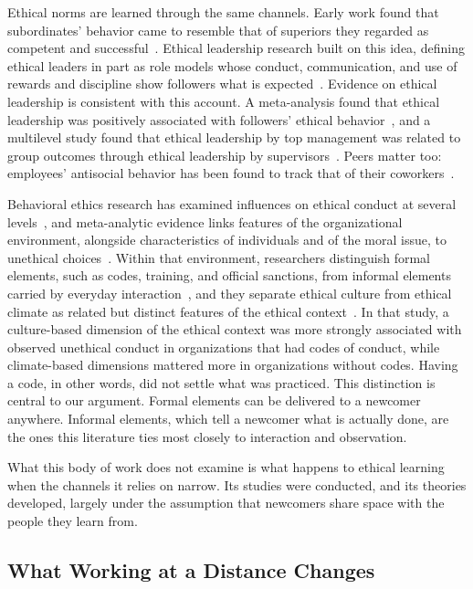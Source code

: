 Ethical norms are learned through the same channels. Early work found that subordinates' behavior came to resemble that of superiors they regarded as competent and successful~\citep{weiss1977subordinate}. Ethical leadership research built on this idea, defining ethical leaders in part as role models whose conduct, communication, and use of rewards and discipline show followers what is expected~\citep{brown2005ethical,brown2006ethical}. Evidence on ethical leadership is consistent with this account. A meta-analysis found that ethical leadership was positively associated with followers' ethical behavior~\citep{bedi2016meta}, and a multilevel study found that ethical leadership by top management was related to group outcomes through ethical leadership by supervisors~\citep{mayer2009how}. Peers matter too: employees' antisocial behavior has been found to track that of their coworkers~\citep{robinson1998monkey}.

Behavioral ethics research has examined influences on ethical conduct at several levels~\citep{trevino2006behavioral}, and meta-analytic evidence links features of the organizational environment, alongside characteristics of individuals and of the moral issue, to unethical choices~\citep{kishgephart2010bad}. Within that environment, researchers distinguish formal elements, such as codes, training, and official sanctions, from informal elements carried by everyday interaction~\citep{tenbrunsel2003building}, and they separate ethical culture from ethical climate as related but distinct features of the ethical context~\citep{trevino1998ethical}. In that study, a culture-based dimension of the ethical context was more strongly associated with observed unethical conduct in organizations that had codes of conduct, while climate-based dimensions mattered more in organizations without codes. Having a code, in other words, did not settle what was practiced. This distinction is central to our argument. Formal elements can be delivered to a newcomer anywhere. Informal elements, which tell a newcomer what is actually done, are the ones this literature ties most closely to interaction and observation.

What this body of work does not examine is what happens to ethical learning when the channels it relies on narrow. Its studies were conducted, and its theories developed, largely under the assumption that newcomers share space with the people they learn from.

\subsection{What Working at a Distance Changes}

